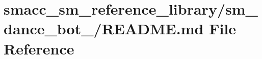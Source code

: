 \hypertarget{smacc__sm__reference__library_2sm__dance__bot__3_2README_8md}{}\section{smacc\+\_\+sm\+\_\+reference\+\_\+library/sm\+\_\+dance\+\_\+bot\+\_/\+R\+E\+A\+D\+ME.md File Reference}
\label{smacc__sm__reference__library_2sm__dance__bot__3_2README_8md}
